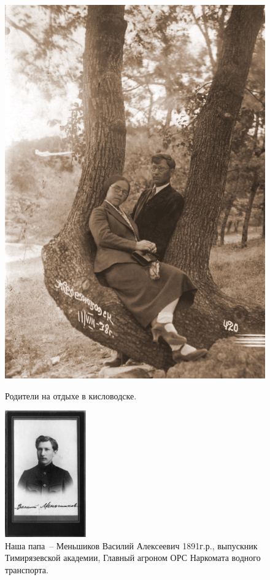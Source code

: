 \documentclass[utf8x, 10pt]{G7-32} %
\begin{document}
\begin{figure}[h!]
\begin{minipage}[h]{70mm}
       \includegraphics[width=\linewidth]{inc/Menshekovy/12.jpg} 
       \caption{Родители на отдыхе в кисловодске.}
   \end{minipage}
   \hfill
    \begin{minipage}[h!]{50mm}
        \begin{center}
        \includegraphics[width=35mm]{inc/Menshekovy/13.jpg}
        \end{center}
        \caption{Наша папа~-- Меньшиков Василий Алексеевич 1891г.р., выпускник Тимирязевской академии, Главный агроном ОРС Наркомата водного транспорта.}
    \end{minipage}

\end{figure}
\end{document}
